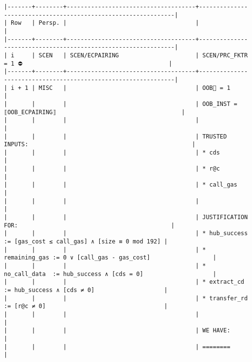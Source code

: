 \documentclass[varwidth=\maxdimen,margin=0.5cm,multi={verbatim}]{standalone}
\begin{document}
\begin{verbatim}
|-------+--------+-------------------------------------+---------------------------------------------------------------|
| Row   | Persp. |                                     |                                                               |
|-------+--------+-------------------------------------+---------------------------------------------------------------|
| i     | SCEN   | SCEN/ECPAIRING                      | SCEN/PRC_FKTR = 1 ⛔                                          |
|-------+--------+-------------------------------------+---------------------------------------------------------------|
| i + 1 | MISC   |                                     | OOB🏴 = 1                                                     |
|       |        |                                     | OOB_INST = ⟦OOB_ECPAIRING⟧                                    |
|       |        |                                     |                                                               |
|       |        |                                     | TRUSTED INPUTS:                                               |
|       |        |                                     | * cds                                                         |
|       |        |                                     | * r@c                                                         |
|       |        |                                     | * call_gas                                                    |
|       |        |                                     |                                                               |
|       |        |                                     | JUSTIFICATION FOR:                                            |
|       |        |                                     | * hub_success   := [gas_cost ≤ call_gas] ∧ [size ≡ 0 mod 192] |
|       |        |                                     | * remaining_gas := 0 ∨ [call_gas - gas_cost]                  |
|       |        |                                     | * no_call_data  := hub_success ∧ [cds = 0]                    |
|       |        |                                     | * extract_cd    := hub_success ∧ [cds ≠ 0]                    |
|       |        |                                     | * transfer_rd   := [r@c ≠ 0]                                  |
|       |        |                                     |                                                               |
|       |        |                                     | WE HAVE:                                                      |
|       |        |                                     | ========                                                      |

\end{verbatim}
\end{document}
